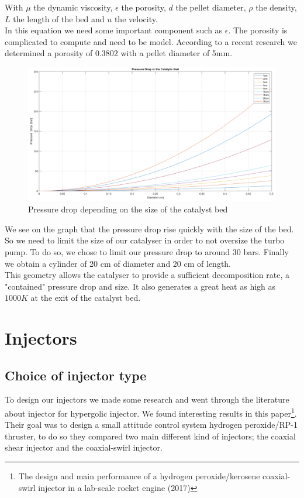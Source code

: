 With $\mu$ the dynamic viscosity, $\epsilon$ the porosity, $d$ the pellet diameter, $\rho$ the density, $L$ the length of the bed and $u$ the velocity. \\

In this equation we need some important component such as $\epsilon$. The porosity is complicated to compute and need to be model. According to a recent research we determined a porosity of $0.3802$ with a pellet diameter of 5mm.

\begin{figure}[H]
	\centering
	\includegraphics[width=\linewidth]{pressuredrop}
	\caption{Pressure drop depending on the size of the catalyst bed}
\end{figure}

We see on the graph that the pressure drop rise quickly with the size of the bed. So we need to limit the size of our catalyser in order to not oversize the turbo pump. To do so, we chose to limit our pressure drop to around 30 bars. Finally we obtain a cylinder of 20 cm of diameter and 20 cm of length. \\

This geometry allows the catalyser to provide a sufficient decomposition rate, a "contained" pressure drop and size. It also generates a great heat as high as $1000K$ at the exit of the catalyst bed. 

\section{Injectors}
\subsection{Choice of injector type}
To design our injectors we made some research and went through the literature about injector for hypergolic injector. We found interesting results in this paper\footnote{The design and main performance of a hydrogen peroxide/kerosene coaxial-swirl injector in a lab-scale rocket engine (2017)}. Their goal was to design a small attitude control system hydrogen peroxide/RP-1 thruster, to do so they compared two main different kind of injectors; the coaxial shear injector and the coaxial-swirl injector. \\

